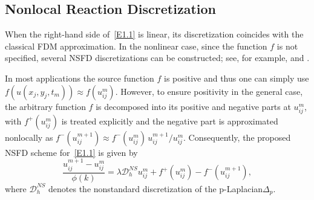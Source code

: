\documentclass[final,12pt,3p]{elsarticle}
\theoremstyle{plain}
\theoremstyle{definition}
\theoremstyle{remark}
\begin{document}
\subsection{Nonlocal Reaction Discretization}\label{S2.2}
When the right-hand side of~\eqref{E1.1} is linear, its discretization coincides with the classical FDM approximation. In the nonlinear case, since the function $f$ is not specified, several NSFD discretizations can be constructed; see, for example, \cite[pp.~11--13]{Zinihi2026Actuarial} and \cite[p.~6]{Zinihi2025NSFD}. 

In most applications the source function $f$ is positive and thus one can simply
use $f(u(x_j,y_j,t_m))\approx f(u_{ij}^m)$.
However, to ensure positivity in the general case, the arbitrary function $f$ is decomposed into its positive and negative parts at $u_{ij}^{m}$, with $f^+(u_{ij}^{m})$ %
is treated explicitly and the negative part is approximated nonlocally as $f^-(u_{ij}^{m+1})\approx f^-(u_{ij}^m)\,u_{ij}^{m+1}/u_{ij}^m$. %
Consequently, the proposed NSFD scheme for~\eqref{E1.1} is given by
\begin{equation}\label{E2.1}
\frac{u_{ij}^{m+1}-u_{ij}^{m}}{\phi(k)} = \lambda \mathcal{D}_h^{NS} u_{ij}^m + f^+(u_{ij}^m) - f^-(u_{ij}^{m+1}),
\end{equation}
where $\mathcal{D}_h^{NS}$ denotes the nonstandard discretization of the p-Laplacian$\Delta_p$.
\end{document}
